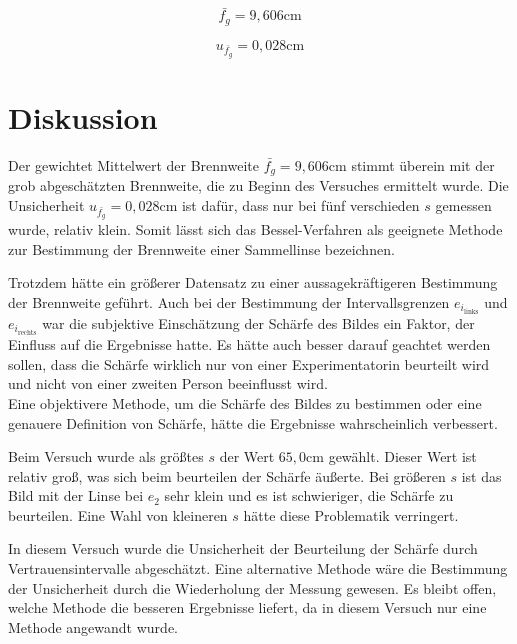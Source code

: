 \documentclass[a4paper,12pt]{article}
\begin{document}
\begin{equation*}
    \bar{f_g} = 9,606\mathrm{cm}
\end{equation*}

\begin{equation*}
    u_{\bar{f_g}} = 0,028\mathrm{cm}
\end{equation*}


\section{Diskussion}

Der gewichtet Mittelwert der Brennweite $\bar{f_g} = 9,606\mathrm{cm}$ stimmt überein mit der grob abgeschätzten
Brennweite, die zu Beginn des Versuches ermittelt wurde. Die Unsicherheit $u_{\bar{f_g}} = 0,028\mathrm{cm}$ ist
dafür, dass nur bei fünf verschieden $s$ gemessen wurde, relativ klein.
Somit lässt sich das Bessel-Verfahren als geeignete Methode zur Bestimmung der Brennweite einer Sammellinse
bezeichnen.

Trotzdem hätte ein größerer Datensatz zu einer aussagekräftigeren Bestimmung der Brennweite geführt.
Auch bei der Bestimmung der Intervallsgrenzen $e_{i_\mathrm{links}}$ und $e_{i_\mathrm{rechts}}$ war
die subjektive Einschätzung der Schärfe des Bildes ein Faktor, der Einfluss auf die Ergebnisse hatte.
Es hätte auch besser darauf geachtet werden sollen, dass die Schärfe wirklich nur von einer
Experimentatorin beurteilt wird und nicht von einer zweiten Person beeinflusst wird.\\
Eine objektivere Methode, um die Schärfe des Bildes zu bestimmen oder eine genauere Definition von
Schärfe, hätte die Ergebnisse wahrscheinlich verbessert.

Beim Versuch wurde als größtes $s$ der Wert $65,0\mathrm{cm}$ gewählt. Dieser Wert ist relativ groß,
was sich beim beurteilen der Schärfe äußerte. Bei größeren $s$ ist das Bild mit der Linse bei $e_2$
sehr klein und es ist schwieriger, die Schärfe zu beurteilen. Eine Wahl von kleineren $s$ hätte
diese Problematik verringert.

In diesem Versuch wurde die Unsicherheit der Beurteilung der Schärfe durch Vertrauensintervalle
abgeschätzt. Eine alternative Methode wäre die Bestimmung der Unsicherheit durch die Wiederholung
der Messung gewesen. Es bleibt offen, welche Methode die besseren Ergebnisse liefert, da in diesem
Versuch nur eine Methode angewandt wurde.
\end{document}
